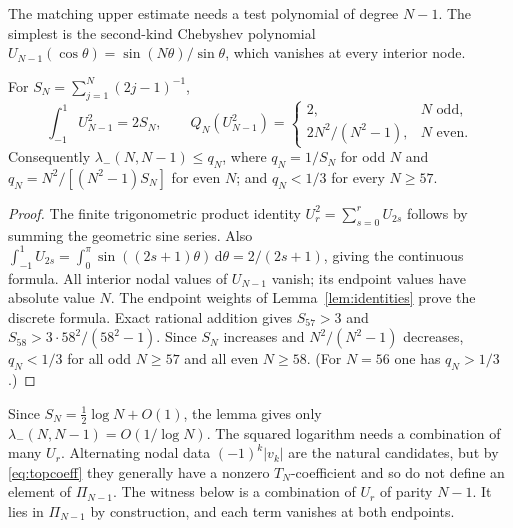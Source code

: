 \documentclass{siamart251216}
\newcommand{\Pn}{\Pi}
\newcommand{\dd}{\,\mathrm d}
\begin{document}
The matching upper estimate needs a test polynomial of degree $N-1$.
The simplest is the second-kind Chebyshev polynomial
$U_{N-1}(\cos\theta)=\sin(N\theta)/\sin\theta$, which vanishes at every
interior node.

\begin{lemma}\label{lem:U-exact}%
For $S_N=\sum_{j=1}^N(2j-1)^{-1}$,
\begin{equation}\label{eq:Uexact}
 \int_{-1}^1U_{N-1}^2=2S_N,\qquad
 Q_N(U_{N-1}^2)=
 \begin{cases}2,&N\text{ odd},\\2N^2/(N^2-1),&N\text{ even}.
 \end{cases}
\end{equation}
Consequently $\lambda_-(N,N-1)\le q_N$, where $q_N=1/S_N$ for odd $N$ and
$q_N=N^2/[(N^2-1)S_N]$ for even $N$; and $q_N<1/3$ for every $N\ge57$.
\end{lemma}

\begin{proof}
The finite trigonometric product identity
$U_r^2=\sum_{s=0}^rU_{2s}$ follows by summing the geometric sine series.
Also $\int_{-1}^1U_{2s}=\int_0^\pi\sin((2s+1)\theta)\dd\theta
=2/(2s+1)$, giving the continuous formula.
All interior nodal values of $U_{N-1}$ vanish; its endpoint values have
absolute value $N$. The endpoint weights of Lemma~\ref{lem:identities}
prove the discrete formula. Exact rational addition gives
$S_{57}>3$ and $S_{58}>3\cdot58^2/(58^2-1)$. Since $S_N$ increases and
$N^2/(N^2-1)$ decreases, $q_N<1/3$ for all odd $N\ge57$ and all even
$N\ge58$. (For $N=56$ one has $q_N>1/3$.)
\end{proof}

Since $S_N=\frac12\log N+O(1)$, the lemma gives only
$\lambda_-(N,N-1)=O(1/\log N)$. The squared logarithm needs a
combination of many $U_r$. Alternating nodal data $(-1)^k|v_k|$ are the
natural candidates, but by \eqref{eq:topcoeff} they generally have a nonzero
$T_N$-coefficient and so do not define an element of $\Pn_{N-1}$. The witness
below is a combination of $U_r$ of parity $N-1$. It lies in $\Pn_{N-1}$ by
construction, and each term vanishes at both endpoints.
\end{document}
